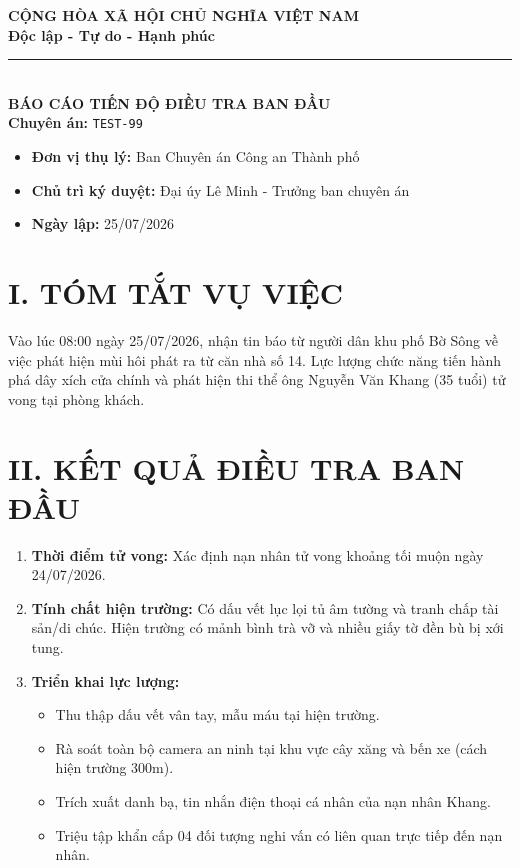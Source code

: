 \documentclass[12pt,a4paper]{article}
\begin{document}
\begin{center}
    \textbf{\Large CỘNG HÒA XÃ HỘI CHỦ NGHĨA VIỆT NAM}\\
    \textbf{\large Độc lập - Tự do - Hạnh phúc}\\
    \rule{8cm}{0.5pt}\\[0.5cm]
    
    \textbf{\LARGE BÁO CÁO TIẾN ĐỘ ĐIỀU TRA BAN ĐẦU}\\
    \textbf{Chuyên án:} \texttt{TEST-99}
\end{center}

\vspace{0.3cm}

\begin{tcolorbox}[colback=gray!10!white,colframe=black!75!black,title=\textbf{THÔNG TIN BÁO CÁO}]
\begin{itemize}[leftmargin=*]
    \item \textbf{Đơn vị thụ lý:} Ban Chuyên án Công an Thành phố
    \item \textbf{Chủ trì ký duyệt:} Đại úy Lê Minh - Trưởng ban chuyên án
    \item \textbf{Ngày lập:} 25/07/2026
\end{itemize}
\end{tcolorbox}

\section*{I. TÓM TẮT VỤ VIỆC}
Vào lúc 08:00 ngày 25/07/2026, nhận tin báo từ người dân khu phố Bờ Sông về việc phát hiện mùi hôi phát ra từ căn nhà số 14. Lực lượng chức năng tiến hành phá dây xích cửa chính và phát hiện thi thể ông Nguyễn Văn Khang (35 tuổi) tử vong tại phòng khách.

\section*{II. KẾT QUẢ ĐIỀU TRA BAN ĐẦU}
\begin{enumerate}
    \item \textbf{Thời điểm tử vong:} Xác định nạn nhân tử vong khoảng tối muộn ngày 24/07/2026.
    \item \textbf{Tính chất hiện trường:} Có dấu vết lục lọi tủ âm tường và tranh chấp tài sản/di chúc. Hiện trường có mảnh bình trà vỡ và nhiều giấy tờ đền bù bị xới tung.
    \item \textbf{Triển khai lực lượng:}
    \begin{itemize}
        \item Thu thập dấu vết vân tay, mẫu máu tại hiện trường.
        \item Rà soát toàn bộ camera an ninh tại khu vực cây xăng và bến xe (cách hiện trường 300m).
        \item Trích xuất danh bạ, tin nhắn điện thoại cá nhân của nạn nhân Khang.
        \item Triệu tập khẩn cấp 04 đối tượng nghi vấn có liên quan trực tiếp đến nạn nhân.
    \end{itemize}
\end{enumerate}
\end{document}
